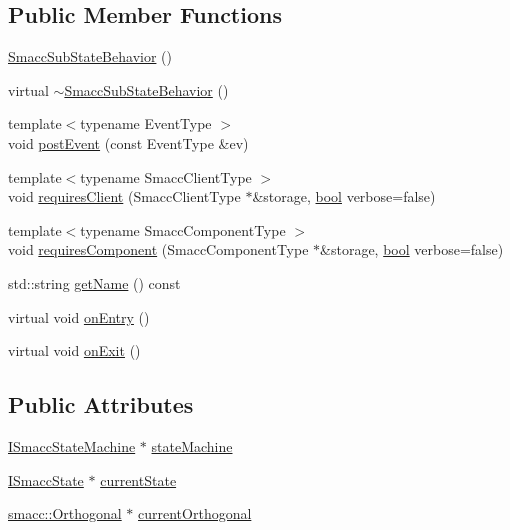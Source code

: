 \subsection*{Public Member Functions}
\begin{DoxyCompactItemize}
\item 
\hyperlink{classsmacc_1_1SmaccSubStateBehavior_abc902f4fa003071f759a2255b276fb90}{Smacc\+Sub\+State\+Behavior} ()
\item 
virtual \hyperlink{classsmacc_1_1SmaccSubStateBehavior_a227d9dd0ce011ca1f6c88dd264ac85fe}{$\sim$\+Smacc\+Sub\+State\+Behavior} ()
\item 
{\footnotesize template$<$typename Event\+Type $>$ }\\void \hyperlink{classsmacc_1_1SmaccSubStateBehavior_a8538664f9828247727a27446112788a2}{post\+Event} (const Event\+Type \&ev)
\item 
{\footnotesize template$<$typename Smacc\+Client\+Type $>$ }\\void \hyperlink{classsmacc_1_1SmaccSubStateBehavior_ae8361a9e794b02f9f3d962b881e4fd7d}{requires\+Client} (Smacc\+Client\+Type $\ast$\&storage, \hyperlink{classbool}{bool} verbose=false)
\item 
{\footnotesize template$<$typename Smacc\+Component\+Type $>$ }\\void \hyperlink{classsmacc_1_1SmaccSubStateBehavior_a9f31f62f886cc06017e92fa0d834b12d}{requires\+Component} (Smacc\+Component\+Type $\ast$\&storage, \hyperlink{classbool}{bool} verbose=false)
\item 
std\+::string \hyperlink{classsmacc_1_1SmaccSubStateBehavior_a077a9784d17e3a95284ad351a43cfcbb}{get\+Name} () const 
\item 
virtual void \hyperlink{classsmacc_1_1SmaccSubStateBehavior_a47eb8983afa8e1d312873a9a297b84f3}{on\+Entry} ()
\item 
virtual void \hyperlink{classsmacc_1_1SmaccSubStateBehavior_afaeb44666136c5ae47a53dde89fa5d31}{on\+Exit} ()
\end{DoxyCompactItemize}
\subsection*{Public Attributes}
\begin{DoxyCompactItemize}
\item 
\hyperlink{classsmacc_1_1ISmaccStateMachine}{I\+Smacc\+State\+Machine} $\ast$ \hyperlink{classsmacc_1_1SmaccSubStateBehavior_ae3ff8a316bdd4bc5b7fee59d19464609}{state\+Machine}
\item 
\hyperlink{classsmacc_1_1ISmaccState}{I\+Smacc\+State} $\ast$ \hyperlink{classsmacc_1_1SmaccSubStateBehavior_a62e2b9da4a446f09396d0b4c01659b88}{current\+State}
\item 
\hyperlink{classsmacc_1_1Orthogonal}{smacc\+::\+Orthogonal} $\ast$ \hyperlink{classsmacc_1_1SmaccSubStateBehavior_a40aac919bb306d95838fdfcc34cfe391}{current\+Orthogonal}
\end{DoxyCompactItemize}



